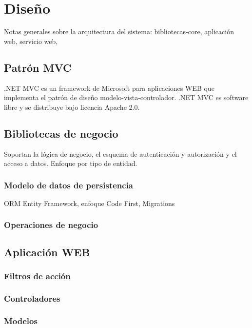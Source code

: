 \chapter{Diseño}
Notas generales sobre la arquitectura del sistema: bibliotecas-core, aplicación web, servicio web, 

\section{Patrón MVC}

.NET MVC es un framework de Microsoft para aplicaciones WEB que implementa el patrón de diseño modelo-vista-controlador. .NET MVC es software libre y se distribuye bajo licencia Apache 2.0.

\section{Bibliotecas de negocio}

Soportan la lógica de negocio, el esquema de autenticación y autorización y el acceso a datos. Enfoque por tipo de entidad.

\subsection{Modelo de datos de persistencia}

ORM Entity Framework, enfoque Code First, Migrations

\subsection{Operaciones de negocio}

\section{Aplicación WEB}

\subsection{Filtros de acción}

\subsection{Controladores}

\subsection{Modelos}

